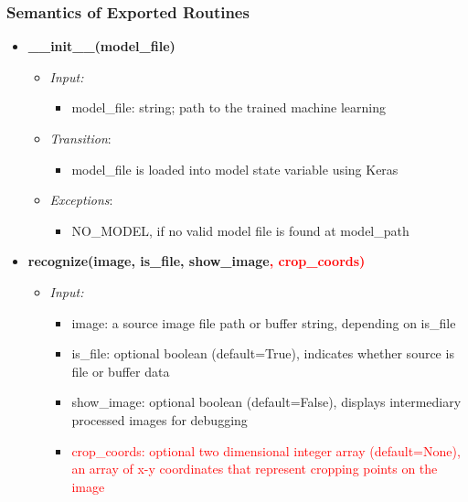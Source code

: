 \documentclass[11pt]{article}
\begin{document}
		\subsubsection{Semantics of Exported Routines}
		\begin{itemize}
		    \item \textbf{\_\_init\_\_(model\_file)}
		\begin{itemize}
		    \item[] \textit{Input: }
			\begin{itemize}
		        \item model\_file: string; path to the trained machine learning
		    \end{itemize}	    
		    
		    \item[] \textit{Transition}: 
		    \begin{itemize}
		        \item model\_file is loaded into model state variable using Keras
		    \end{itemize}
		    
		    \item[] \textit{Exceptions}:
		    \begin{itemize}
		        \item NO\_MODEL, if no valid model file is found at model\_path
		    \end{itemize}
		\end{itemize}
		
		
		\item \textbf{recognize(image, is\_file, show\_image\textcolor{red}{, crop\_coords)}}
		\begin{itemize}
		    \item[] \textit{Input: }
			\begin{itemize}
		        \item image: a source image file path or buffer string, depending on is\_file
		        \item is\_file: optional boolean (default=True), indicates whether source is file or buffer data
		        \item show\_image: optional boolean (default=False), displays intermediary processed images for debugging
		        \item \textcolor{red}{crop\_coords: optional two dimensional integer array (default=None), an array of x-y coordinates that represent cropping points on the image}
		    \end{itemize}	    
		    

\end{itemize}
\end{itemize}
\end{document}
